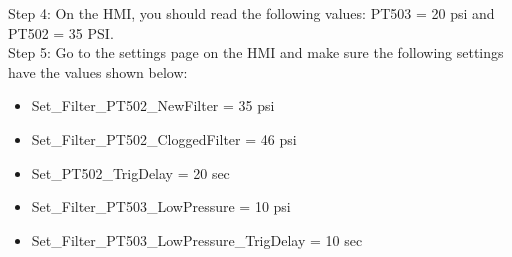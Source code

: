 Step 4: On the HMI, you should read the following values: PT503 = 20 psi and PT502 = 35 PSI.\\
\newpage
Step 5: Go to the settings page on the HMI and make sure the following settings have the values shown below:

\begin{itemize}
    \item Set\_Filter\_PT502\_NewFilter = 35 psi
    \item Set\_Filter\_PT502\_CloggedFilter = 46 psi
    \item Set\_PT502\_TrigDelay = 20 sec
    \item Set\_Filter\_PT503\_LowPressure = 10 psi
    \item Set\_Filter\_PT503\_LowPressure\_TrigDelay = 10 sec
\end{itemize}